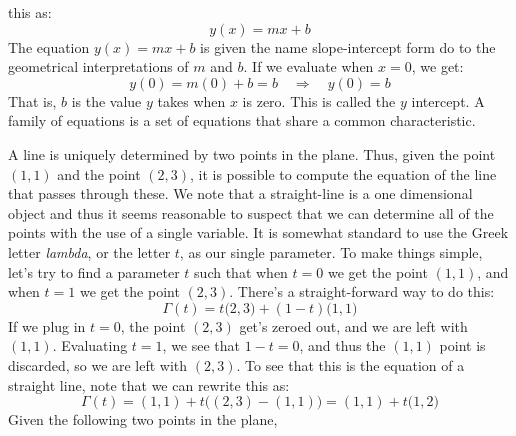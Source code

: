 \documentclass[crop=false,class=book,oneside]{standalone}                      %
\begin{document}
            this as:
            \begin{equation}
                y(x)=mx+b
            \end{equation}
            The equation $y(x)=mx+b$ is given the name slope-intercept form do
            to the geometrical interpretations of $m$ and $b$. If we evaluate
            when $x=0$, we get:
            \begin{equation}
                y(0)=m(0)+b=b
                \quad\Longrightarrow\quad
                y(0)=b
            \end{equation}
            That is, $b$ is the value $y$ takes when $x$ is zero. This is
            called the $y$ intercept.
            A family of equations is a set of equations that share a
            common characteristic.
            \begin{lexample}
                A line is uniquely determined by two points in the plane.
                Thus, given the point $(1,1)$ and the point $(2,3)$, it is
                possible to compute the equation of the line that passes through
                these. We note that a straight-line is a one dimensional object
                and thus it seems reasonable to suspect that we can determine
                all of the points with the use of a single variable. It is
                somewhat standard to use the Greek letter \textit{lambda}, or
                the letter $t$, as our single parameter. To make things simple,
                let's try to find a parameter $t$ such that when $t=0$ we get
                the point $(1,1)$, and when $t=1$ we get the point $(2,3)$.
                There's a straight-forward way to do this:
                \begin{equation}
                    \Gamma(t)=t\big(2,3\big)+(1-t)\big(1,1\big)
                \end{equation}
                If we plug in $t=0$, the point $(2,3)$ get's zeroed out, and
                we are left with $(1,1)$. Evaluating $t=1$, we see that
                $1-t=0$, and thus the $(1,1)$ point is discarded, so we are
                left with $(2,3)$. To see that this is the equation of a
                straight line, note that we can rewrite this as:
                \begin{equation}
                    \Gamma(t)=(1,1)+t\big((2,3)-(1,1)\big)
                             =(1,1)+t\big(1,2\big)
                \end{equation}
                Given the following two points in the plane,

\end{lexample}
\end{document}
